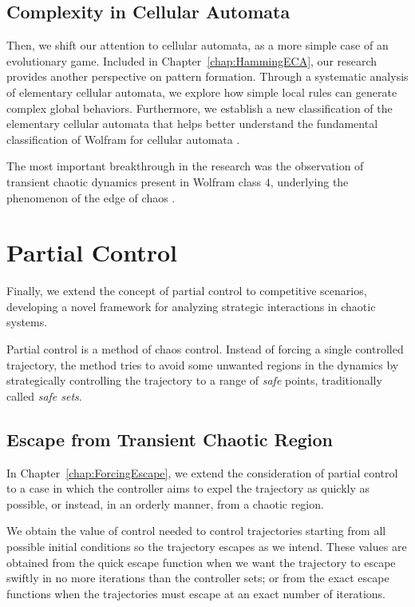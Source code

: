 \subsection{Complexity in Cellular Automata}

Then, we shift our attention to cellular automata, as a more simple case of an evolutionary game. Included in Chapter~\ref{chap:HammingECA}, our research provides another perspective on pattern formation. Through a systematic analysis of elementary cellular automata, we explore how simple local rules can generate complex global behaviors. Furthermore, we establish a new classification of the elementary cellular automata that helps better understand the fundamental classification of Wolfram for cellular automata \cite{cit:WolframClass}.

The most important breakthrough in the research was the observation of transient chaotic dynamics present in Wolfram class $4$, underlying the phenomenon of the edge of chaos \cite{cit:EdgeChaos}. 

\section{Partial Control}


Finally, we extend the concept of partial control \cite{cit:Yorke,cit:DynamicsPartialControl,cit:PartialControlBeyond,cit:PartialControlFunctions} to competitive scenarios, developing a novel framework for analyzing strategic interactions in chaotic systems. 


Partial control is a method of chaos control. Instead of forcing a single controlled trajectory, the method tries to avoid some unwanted regions in the dynamics by strategically controlling the trajectory to a range of \textit{safe} points, traditionally called \textit{safe sets}.

\subsection{Escape from Transient Chaotic Region}

In Chapter~\ref{chap:ForcingEscape}, we extend the consideration of partial control to a case in which the controller aims to expel the trajectory as quickly as possible, or instead, in an orderly manner, from a chaotic region. 

We obtain the value of control needed to control trajectories starting from all possible initial conditions so the trajectory escapes as we intend. These values are obtained from the quick escape function when we want the trajectory to escape swiftly in no more iterations than the controller sets; or from the exact escape functions when the trajectories must escape at an exact number of iterations.

